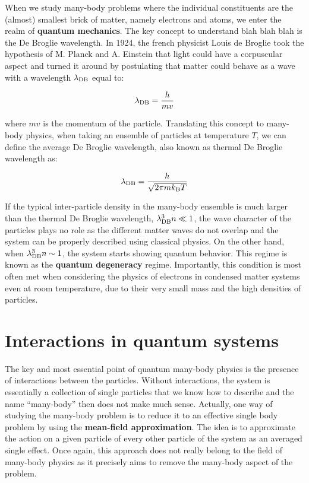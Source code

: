 When we study many-body problems where the individual constituents are the (almost) smallest brick of matter, namely electrons and atoms, we enter the realm of \textbf{quantum mechanics}. The key concept to understand blah blah blah is the De Broglie wavelength. In 1924, the french physicist Louis de Broglie took the hypothesis of M. Planck and A. Einstein that light could have a corpuscular aspect and turned it around by postulating that matter could behave as a wave with a wavelength $\lambda_{\rm{DB}}$ equal to:

\begin{equation}
    \lambda_{\rm{DB}} = \frac{h}{mv}
\end{equation}

\noindent where $mv$ is the momentum of the particle. Translating this concept to many-body physics, when taking an ensemble of particles at temperature $T$, we can define the average De Broglie wavelength, also known as thermal De Broglie wavelength as:

\begin{equation}
    \lambda_{\rm{DB}} = \frac{h}{\sqrt{2 \pi m k_{\mathrm{B}} T}}
\end{equation}

If the typical inter-particle density in the many-body ensemble is much larger than the thermal De Broglie wavelength, \ie $\lambda_{\rm{DB}}^3 n \ll 1$, the wave character of the particles plays no role as the different matter waves do not overlap and the system can be properly described using classical physics. On the other hand, when $\lambda_{\rm{DB}}^3 n \sim 1$, the system starts showing quantum behavior. This regime is known as the \textbf{quantum degeneracy} regime. Importantly, this condition is most often met when considering the physics of electrons in condensed matter systems even at room temperature, due to their very small mass and the high densities of particles.

\section*{Interactions in quantum systems}

The key and most essential point of quantum many-body physics is the presence of interactions between the particles. Without interactions, the system is essentially a collection of single particles that we know how to describe and the name ``many-body'' then does not make much sense. Actually, one way of studying the many-body problem is to reduce it to an effective single body problem by using the \textbf{mean-field approximation}. The idea is to approximate the action on a given particle of every other particle of the system as an averaged single effect. Once again, this approach does not really belong to the field of many-body physics as it precisely aims to remove the many-body aspect of the problem.

